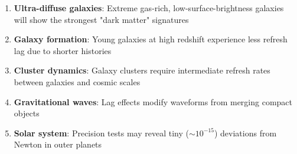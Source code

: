 \documentclass[twocolumn,prd,amsmath,amssymb,aps,superscriptaddress,nofootinbib]{revtex4-2}
\begin{document}
\begin{enumerate}
\item \textbf{Ultra-diffuse galaxies}: Extreme gas-rich, low-surface-brightness galaxies will show the strongest "dark matter" signatures
\item \textbf{Galaxy formation}: Young galaxies at high redshift experience less refresh lag due to shorter histories
\item \textbf{Cluster dynamics}: Galaxy clusters require intermediate refresh rates between galaxies and cosmic scales
\item \textbf{Gravitational waves}: Lag effects modify waveforms from merging compact objects
\item \textbf{Solar system}: Precision tests may reveal tiny ($\sim 10^{-15}$) deviations from Newton in outer planets
\end{enumerate}
\end{document}
